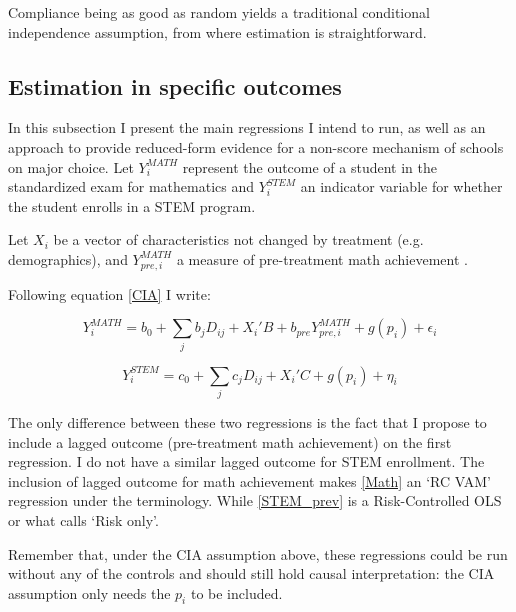 \documentclass[a4paper, article, english, oneside, unknownkeysallowed, 12pt]{memoir}
\begin{document}
Compliance being as good as random yields a traditional conditional independence assumption, from where estimation is straightforward. 


\subsection{Estimation in specific outcomes}

In this subsection I present the main regressions I intend to run, as well as an approach to provide reduced-form evidence for a non-score mechanism of schools on major choice.
Let $Y^{MATH}_i$ represent the outcome of a student in the standardized exam for mathematics and $Y^{STEM}_i$ an indicator variable for whether the student enrolls in a STEM program. 

Let $X_i$ be a vector of characteristics not changed by treatment (e.g. demographics), and $Y^{MATH}_{pre,i}$ a measure of pre-treatment math achievement .

Following equation \ref{CIA} I write:

\begin{equation}
  Y^{MATH}_i = b_0 + \sum_j b_j D_{ij} +  X_i' B + b_{pre} Y^{MATH}_{pre,i} +   g(p_i) + \epsilon_i 
  \label{Math}
\end{equation}


\begin{equation}
  Y^{STEM}_i = c_0 + \sum_j c_j D_{ij} + X_i' C + g(p_i) + \eta_i 
  \label{STEM_prev}
\end{equation}

The only difference between these two regressions is the fact that I propose to include a lagged outcome (pre-treatment math achievement) on the first regression.
I do not have a similar lagged outcome for STEM enrollment. 
The inclusion of lagged outcome for math achievement makes \ref{Math} an `RC VAM' regression under the \textcite{angrist_credible_2024} terminology. While \ref{STEM_prev} is a Risk-Controlled OLS or what \textcite{angrist_credible_2024} calls `Risk only'. 

Remember that, under the CIA assumption above, these regressions could be run without any of the controls and should still hold causal interpretation: the CIA assumption only needs the $p_i$ to be included.
\end{document}
